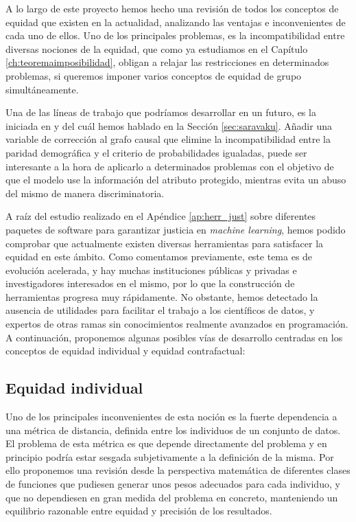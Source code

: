 \documentclass[oneside,openright,titlepage,numbers=noenddot,openany,headinclude,footinclude=true,
cleardoublepage=empty,abstractoff,BCOR=5mm,paper=a4,fontsize=12pt,main=spanish]{scrreprt}
\begin{document}
A lo largo de este proyecto hemos hecho una revisión de todos los conceptos de equidad que existen en la actualidad, analizando las ventajas e inconvenientes de cada uno de ellos. Uno de los principales problemas, es la incompatibilidad entre diversas nociones de la equidad, que como ya estudiamos en el Capítulo \ref{ch:teoremaimposibilidad}, obligan a relajar las restricciones en determinados problemas, si queremos imponer varios conceptos de equidad de grupo simultáneamente.

Una de las líneas de trabajo que podríamos desarrollar en un futuro, es la iniciada en \cite{impossibilityth2021} y del cuál hemos hablado en la Sección \ref{sec:saravaku}. Añadir una variable de corrección al grafo causal que elimine la incompatibilidad entre la paridad demográfica y el criterio de probabilidades igualadas, puede ser interesante a la hora de aplicarlo a determinados problemas con el objetivo de que el modelo use la información del atributo protegido, mientras evita un abuso del mismo de manera discriminatoria.

A raíz del estudio realizado en el Apéndice \ref{ap:herr_just} sobre diferentes paquetes de software para garantizar justicia en \textit{machine learning}, hemos podido comprobar que actualmente existen diversas herramientas para satisfacer la equidad en este ámbito. Como comentamos previamente, este tema es de evolución acelerada, y hay muchas instituciones públicas y privadas e investigadores interesados en el mismo, por lo que la construcción de herramientas progresa muy rápidamente. No obstante, hemos detectado la ausencia de utilidades para facilitar el trabajo a los científicos de datos, y expertos de otras ramas sin conocimientos realmente avanzados en programación. A continuación, proponemos algunas posibles vías de desarrollo centradas en los conceptos de equidad individual y equidad contrafactual:

\subsection*{Equidad individual}

Uno de los principales inconvenientes de esta noción es la fuerte dependencia a una métrica de distancia, definida entre los individuos de un conjunto de datos. El problema de esta métrica es que depende directamente del problema y en principio podría estar sesgada subjetivamente a la definición de la misma. Por ello proponemos una revisión desde la perspectiva matemática de diferentes clases de funciones que pudiesen generar unos pesos adecuados para cada individuo, y que no dependiesen en gran medida del problema en concreto, manteniendo un equilibrio razonable entre equidad y precisión de los resultados. 
\end{document}
